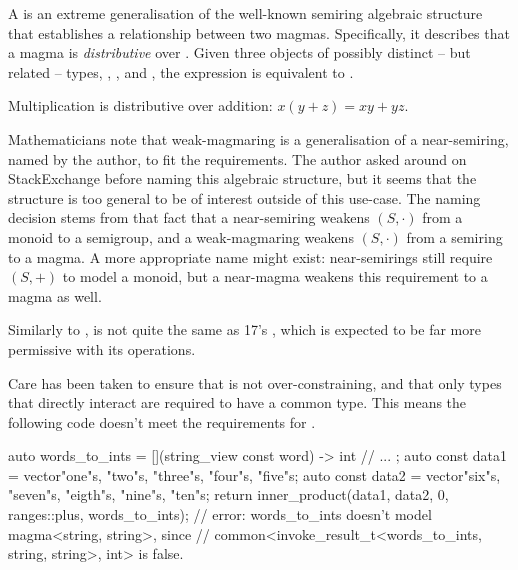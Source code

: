 \begin{itemdescr}
   \pnum
   A  is an extreme generalisation of the well-known semiring algebraic
   structure that establishes a relationship between two magmas. Specifically, it describes that a
   magma  is \textit{distributive} over . Given three objects of possibly
   distinct -- but related -- types, , , and , the expression
    is equivalent to .

   \pnum
   \begin{example}
      Multiplication is distributive over addition: $x(y + z) = xy + yz$.
   \end{example}

   \pnum
   Mathematicians note that weak-magmaring is a generalisation of a near-semiring, named by the
   author, to fit the requirements. The author asked around on StackExchange\cite{stack-exchange-wm}
   before naming this algebraic structure, but it seems that the structure is too general to be of
   interest outside of this use-case. The naming decision stems from that fact that a near-semiring
   weakens $(S, \cdot)$ from a monoid to a semigroup, and a weak-magmaring weakens $(S, \cdot)$ from
   a semiring to a magma. A more appropriate name might exist: near-semirings still require $(S, +)$
   to model a monoid, but a near-magma weakens this requirement to a magma as well.

   \pnum
   Similarly to ,  is not quite the same as
   \Cpp{}17's , which is expected to be far more permissive with its
   operations.
\end{itemdescr}

Care has been taken to ensure that  is not over-constraining, and that only
types that directly interact are required to have a common type. This means the following code
doesn't meet the requirements for .

\begin{codeblock}
auto words_to_ints = [](string_view const word) -> int {
   // ...
};
auto const data1 = vector{"one"s, "two"s, "three"s, "four"s, "five"s};
auto const data2 = vector{"six"s, "seven"s, "eigth"s, "nine"s, "ten"s};
return inner_product(data1, data2, 0, ranges::plus{}, words_to_ints);
// error: words_to_ints doesn't model magma<string, string>, since
//        common<invoke_result_t<words_to_ints, string, string>, int> is false.
\end{codeblock}

